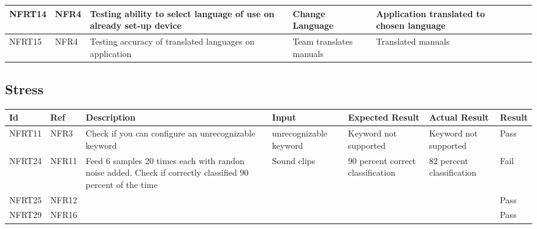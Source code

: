 \documentclass[12pt, titlepage]{article}
\begin{document}
\begin{longtable}{|p{1.4cm}|p{1cm}|p{3cm}|p{1.5cm}|p{2.5cm}|p{2cm}|p{1.2cm}|}
  NFRT14        & NFR4         & Testing ability to select language of use on already set-up device                      & Change Language                  & Application translated to chosen language                                      &                        &     \cellcolor[HTML]{FFFFFF}{\color[HTML]{F8A102} TBD}                                               \\ \hline
  NFRT15        & NFR4         & Testing accuracy of translated languages on application                  & Team translates manuals          & Translated manuals                                          &                        &            \cellcolor[HTML]{FFFFFF}{\color[HTML]{F8A102} TBD}                                        \\ \hline
\end{longtable}

\subsection{Stress}
		
\begin{longtable}{|p{1.4cm}|p{1.4cm}|p{3cm}|p{1.5cm}|p{2.5cm}|p{2cm}|p{1.2cm}|}
  \hline
  \textbf{Id} & \textbf{Ref} & \textbf{Description}                                                         & \textbf{Input}                                    & \textbf{Expected Result}    & \textbf{Actual Result}                          & \textbf{Result}                                     \\ \hline
  NFRT11        & NFR3          & Check if you can configure an unrecognizable keyword              & unrecognizable keyword                          & Keyword not supported                      & Keyword not supported                         & {\color[HTML]{32CB00} Pass}                         \\ \hline
  NFRT24        & NFR11         & Feed 6 samples 20 times each with randon noise added. Check if correctly classified 90 percent of the time           & Sound clips   & 90 percent correct classification        & 82 percent classification     & {\color[HTML]{FE0000} Fail}                           \\ \hline
  NFRT25        & NFR12         &         &   &                   &                     & {\color[HTML]{32CB00} Pass}                         \\ \hline
  NFRT29        & NFR16         & &  & &         & {\color[HTML]{32CB00} Pass}                         \\ \hline
\end{longtable}
\end{document}
